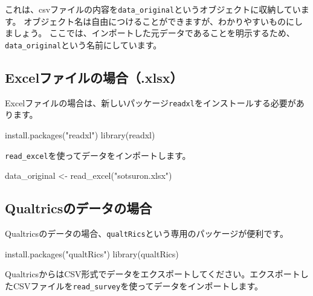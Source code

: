 \documentclass[
]{book}
\newenvironment{Shaded}{\begin{snugshade}}{\end{snugshade}}
\newcommand{\FunctionTok}[1]{\textcolor[rgb]{0.00,0.00,0.00}{#1}}
\newcommand{\NormalTok}[1]{#1}
\newcommand{\OtherTok}[1]{\textcolor[rgb]{0.56,0.35,0.01}{#1}}
\newcommand{\StringTok}[1]{\textcolor[rgb]{0.31,0.60,0.02}{#1}}
\begin{document}
これは、csvファイルの内容を\texttt{data\_original}というオブジェクトに収納しています。
オブジェクト名は自由につけることができますが、わかりやすいものにしましょう。
ここでは、インポートした元データであることを明示するため、\texttt{data\_original}という名前にしています。

\hypertarget{excelux30d5ux30a1ux30a4ux30ebux306eux5834ux5408.xlsx}{%
\subsection{Excelファイルの場合（.xlsx）}\label{excelux30d5ux30a1ux30a4ux30ebux306eux5834ux5408.xlsx}}

Excelファイルの場合は、新しいパッケージ\texttt{readxl}をインストールする必要があります。

\begin{Shaded}
\begin{Highlighting}[]
\FunctionTok{install.packages}\NormalTok{(}\StringTok{"readxl"}\NormalTok{)}
\FunctionTok{library}\NormalTok{(readxl)}
\end{Highlighting}
\end{Shaded}

\texttt{read\_excel}を使ってデータをインポートします。

\begin{Shaded}
\begin{Highlighting}[]
\NormalTok{data\_original }\OtherTok{\textless{}{-}} \FunctionTok{read\_excel}\NormalTok{(}\StringTok{"sotsuron.xlsx"}\NormalTok{)}
\end{Highlighting}
\end{Shaded}

\hypertarget{qualtricsux306eux30c7ux30fcux30bfux306eux5834ux5408}{%
\subsection{Qualtricsのデータの場合}\label{qualtricsux306eux30c7ux30fcux30bfux306eux5834ux5408}}

Qualtricsのデータの場合、\texttt{qualtRics}という専用のパッケージが便利です。

\begin{Shaded}
\begin{Highlighting}[]
\FunctionTok{install.packages}\NormalTok{(}\StringTok{"qualtRics"}\NormalTok{)}
\FunctionTok{library}\NormalTok{(qualtRics)}
\end{Highlighting}
\end{Shaded}

QualtricsからはCSV形式でデータをエクスポートしてください。エクスポートしたCSVファイルを\texttt{read\_survey}を使ってデータをインポートします。
\end{document}
